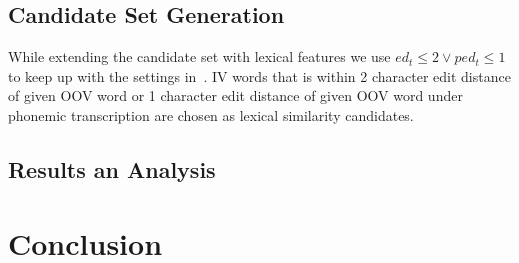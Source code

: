 \subsection{Candidate Set Generation}

While extending the candidate set with lexical features we use ${ed_t \leq 2} \vee {ped_t \leq 1}$ to keep up with the settings in~\cite{Han:2011:LNS:2002472.2002520}. IV words that is within 2 character edit distance of given OOV word or 1 character edit distance of given OOV word under phonemic transcription are chosen as lexical similarity candidates.

\subsection{Results an Analysis}


\section{Conclusion}
